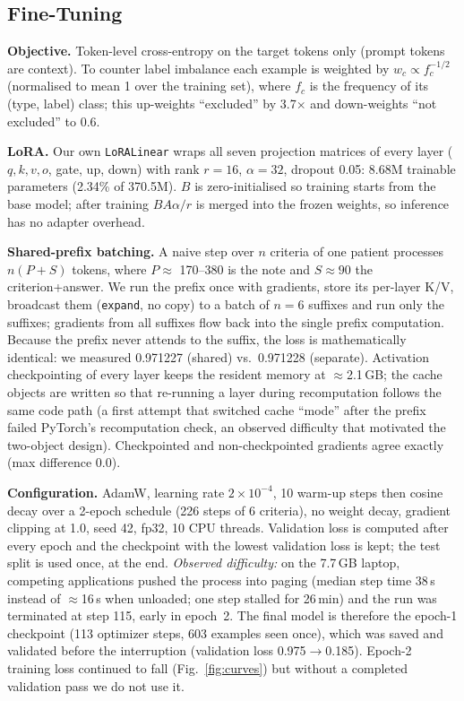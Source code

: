 \documentclass[conference]{IEEEtran}
\begin{document}
\subsection{Fine-Tuning}
\textbf{Objective.} Token-level cross-entropy on the target tokens only (prompt tokens are context). To counter label imbalance each example is weighted by $w_c \propto f_c^{-1/2}$ (normalised to mean 1 over the training set), where $f_c$ is the frequency of its (type, label) class; this up-weights ``excluded'' by 3.7$\times$ and down-weights ``not excluded'' to 0.6.

\textbf{LoRA.} Our own \texttt{LoRALinear} wraps all seven projection matrices of every layer ($q,k,v,o$, gate, up, down) with rank $r{=}16$, $\alpha{=}32$, dropout 0.05: 8.68M trainable parameters (2.34\% of 370.5M). $B$ is zero-initialised so training starts from the base model; after training $BA\alpha/r$ is merged into the frozen weights, so inference has no adapter overhead.

\textbf{Shared-prefix batching.} A naive step over $n$ criteria of one patient processes $n(P+S)$ tokens, where $P\approx$ 170--380 is the note and $S\approx 90$ the criterion+answer. We run the prefix once with gradients, store its per-layer K/V, broadcast them (\texttt{expand}, no copy) to a batch of $n{=}6$ suffixes and run only the suffixes; gradients from all suffixes flow back into the single prefix computation. Because the prefix never attends to the suffix, the loss is mathematically identical: we measured 0.971227 (shared) vs.\ 0.971228 (separate). Activation checkpointing of every layer keeps the resident memory at $\approx$2.1\,GB; the cache objects are written so that re-running a layer during recomputation follows the same code path (a first attempt that switched cache ``mode'' after the prefix failed PyTorch's recomputation check, an observed difficulty that motivated the two-object design). Checkpointed and non-checkpointed gradients agree exactly (max difference 0.0).

\textbf{Configuration.} AdamW, learning rate $2\times10^{-4}$, 10 warm-up steps then cosine decay over a 2-epoch schedule (226 steps of 6 criteria), no weight decay, gradient clipping at 1.0, seed 42, fp32, 10 CPU threads. Validation loss is computed after every epoch and the checkpoint with the lowest validation loss is kept; the test split is used once, at the end. \emph{Observed difficulty:} on the 7.7\,GB laptop, competing applications pushed the process into paging (median step time 38\,s instead of $\approx$16\,s when unloaded; one step stalled for 26\,min) and the run was terminated at step 115, early in epoch~2. The final model is therefore the epoch-1 checkpoint (113 optimizer steps, 603 examples seen once), which was saved and validated before the interruption (validation loss 0.975$\rightarrow$0.185). Epoch-2 training loss continued to fall (Fig.~\ref{fig:curves}) but without a completed validation pass we do not use it.
\end{document}
